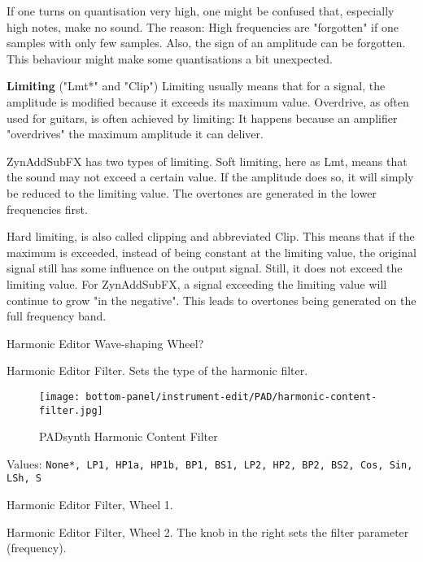    If one turns on quantisation very high, one might be confused that,
   especially high notes, make no sound. The reason: High frequencies are
   "forgotten" if one samples with only few samples. Also, the sign of an
   amplitude can be forgotten. This behaviour might make some quantisations a
   bit unexpected.

   \textbf{Limiting} ("Lmt*" and "Clip")
   Limiting usually means that for a signal, the amplitude is modified
   because it exceeds its maximum value. Overdrive, as often used for
   guitars, is often achieved by limiting: It happens because an amplifier
   "overdrives" the maximum amplitude it can deliver.

   ZynAddSubFX has two types of limiting. Soft limiting, here as Lmt, means
   that the sound may not exceed a certain value. If the amplitude does so,
   it will simply be reduced to the limiting value. The overtones are
   generated in the lower frequencies first.

   Hard limiting, is also called clipping and abbreviated Clip. This means
   that if the maximum is exceeded, instead of being constant at the limiting
   value, the original signal still has some influence on the output signal.
   Still, it does not exceed the limiting value. For ZynAddSubFX, a signal
   exceeding the limiting value will continue to grow "in the negative". This
   leads to overtones being generated on the full frequency band.

   Harmonic Editor Wave-shaping Wheel?

   Harmonic Editor Filter.
   Sets the type of the harmonic filter.

\begin{figure}[H]
   \centering 
   \texttt{[image: bottom-panel/instrument-edit/PAD/harmonic-content-filter.jpg]}
   \caption{PADsynth Harmonic Content Filter}
   \label{fig:}
\end{figure}

   Values: \texttt{None*, LP1, HP1a, HP1b, BP1, BS1, LP2, HP2, BP2,
              BS2, Cos, Sin, LSh, S}

   Harmonic Editor Filter, Wheel 1.

   Harmonic Editor Filter, Wheel 2.
   The knob in the right sets the filter parameter (frequency).


